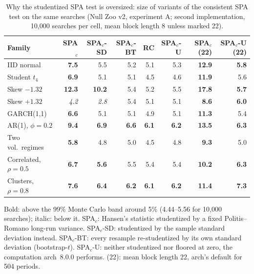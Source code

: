 \begin{table}[t]
\centering
\footnotesize
\setlength{\tabcolsep}{3.5pt}
\caption{Why the studentized SPA test is oversized: size of variants of the consistent SPA test on the same searches (Null Zoo v2, experiment A; second implementation, 10{,}000 searches per cell, mean block length 8 unless marked 22).}
\label{tab:mechanism}
\begin{tabular}{lrrrrrrr}
\toprule
Family & SPA$_c$ & SPA$_c$-SD & SPA$_c$-BT & RC & SPA$_c$-U & SPA$_c$ (22) & SPA$_c$-U (22) \\
\midrule
IID normal & \textbf{7.5} & 5.5 & 5.2 & 5.1 & 5.3 & \textbf{12.9} & \textbf{5.8} \\
Student $t_4$ & \textbf{6.9} & 5.1 & 5.1 & 4.5 & 4.6 & \textbf{11.9} & 5.6 \\
Skew $-1.32$ & \textbf{12.3} & \textbf{10.2} & 5.4 & 5.2 & 5.5 & \textbf{17.8} & \textbf{5.7} \\
Skew $+1.32$ & \textit{4.2} & \textit{2.8} & 5.4 & 5.1 & 5.1 & \textbf{8.6} & \textbf{6.0} \\
GARCH(1,1) & \textbf{6.6} & 5.1 & 5.1 & 4.9 & 5.1 & \textbf{11.3} & 5.4 \\
AR(1), $\phi=0.2$ & \textbf{9.4} & \textbf{6.9} & \textbf{6.6} & \textbf{6.1} & \textbf{6.2} & \textbf{13.5} & \textbf{6.3} \\
Two vol.\ regimes & \textbf{5.8} & 4.8 & 5.0 & 4.5 & 4.8 & \textbf{9.3} & 5.0 \\
Correlated, $\rho=0.5$ & \textbf{6.7} & \textbf{5.6} & 5.5 & 5.4 & 5.4 & \textbf{10.2} & \textbf{6.3} \\
Clusters, $\rho=0.8$ & \textbf{7.6} & \textbf{6.4} & \textbf{6.2} & \textbf{6.1} & \textbf{6.2} & \textbf{11.4} & \textbf{7.3} \\
\bottomrule
\end{tabular}
\par\smallskip\begin{minipage}{0.97\linewidth}\footnotesize Bold: above the 99\% Monte Carlo band around 5\% (4.44--5.56 for 10{,}000 searches); italic: below it. SPA$_c$: Hansen's statistic studentized by a fixed Politis--Romano long-run variance. SPA$_c$-SD: studentized by the sample standard deviation instead. SPA$_c$-BT: every resample re-studentized by its own standard deviation (bootstrap-$t$). SPA$_c$-U: neither studentized nor floored at zero, the computation arch~8.0.0 performs. (22): mean block length 22, arch's default for 504 periods.\end{minipage}
\end{table}

